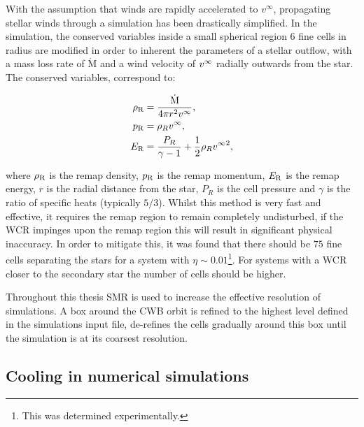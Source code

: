 With the assumption that winds are rapidly accelerated to $v^\infty$, propagating stellar winds through a simulation has been drastically simplified.
In the simulation, the conserved variables inside a small spherical region 6 fine cells in radius are modified in order to inherent the parameters of a stellar outflow, with a mass loss rate of $\dot{\text{M}}$ and a wind velocity of $v^\infty$ radially outwards from the star.
The conserved variables, correspond to:

\begin{subequations}
  \begin{align}
    \rho_\text{R} &= \frac{\dot{\text{M}}}{4 \pi r^2 v^\infty}, \\
    p_\text{R}    &= \rho_R v^\infty, \\
    E_\text{R}    &= \frac{P_R}{\gamma - 1} + \frac{1}{2} \rho_R {v^\infty}^2,
  \end{align}
\end{subequations}

\noindent
where $\rho_\text{R}$ is the remap density, $p_\text{R}$ is the remap momentum, $E_\text{R}$ is the remap energy, $r$ is the radial distance from the star, $P_R$ is the cell pressure and $\gamma$ is the ratio of specific heats (typically $5/3$).
Whilst this method is very fast and effective, it requires the remap region to remain completely undisturbed, if the WCR impinges upon the remap region this will result in significant physical inaccuracy.
In order to mitigate this, it was found that there should be $75$ fine cells separating the stars for a system with $\eta\sim 0.01$\footnote{This was determined experimentally.}.
For systems with a WCR closer to the secondary star the number of cells should be higher.
 
Throughout this thesis SMR is used to increase the effective resolution of simulations.
A box around the CWB orbit is refined to the highest level defined in the simulations input file, \athena{} de-refines the cells gradually around this box until the simulation is at its coarsest resolution.

\subsection{Cooling in numerical simulations}

